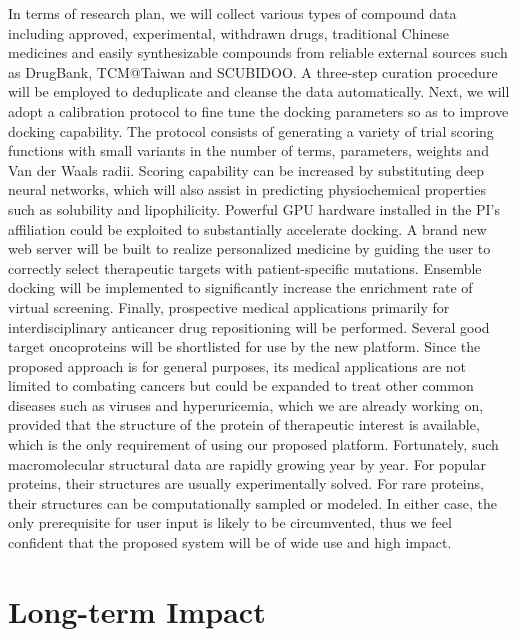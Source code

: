 \documentclass[a4paper,12pt]{article}
\begin{document}
In terms of research plan, we will collect various types of compound data including approved, experimental, withdrawn drugs, traditional Chinese medicines and easily synthesizable compounds from reliable external sources such as DrugBank, TCM@Taiwan and SCUBIDOO. A three-step curation procedure will be employed to deduplicate and cleanse the data automatically. Next, we will adopt a calibration protocol to fine tune the docking parameters so as to improve docking capability. The protocol consists of generating a variety of trial scoring functions with small variants in the number of terms, parameters, weights and Van der Waals radii. Scoring capability can be increased by substituting deep neural networks, which will also assist in predicting physiochemical properties such as solubility and lipophilicity. Powerful GPU hardware installed in the PI's affiliation could be exploited to substantially accelerate docking. A brand new web server will be built to realize personalized medicine by guiding the user to correctly select therapeutic targets with patient-specific mutations. Ensemble docking will be implemented to significantly increase the enrichment rate of virtual screening. Finally, prospective medical applications primarily for interdisciplinary anticancer drug repositioning will be performed. Several good target oncoproteins will be shortlisted for use by the new platform. Since the proposed approach is for general purposes, its medical applications are not limited to combating cancers but could be expanded to treat other common diseases such as viruses and hyperuricemia, which we are already working on, provided that the structure of the protein of therapeutic interest is available, which is the only requirement of using our proposed platform. Fortunately, such macromolecular structural data are rapidly growing year by year. For popular proteins, their structures are usually experimentally solved. For rare proteins, their structures can be computationally sampled or modeled. In either case, the only prerequisite for user input is likely to be circumvented, thus we feel confident that the proposed system will be of wide use and high impact.

\section*{Long-term Impact}
\end{document}
